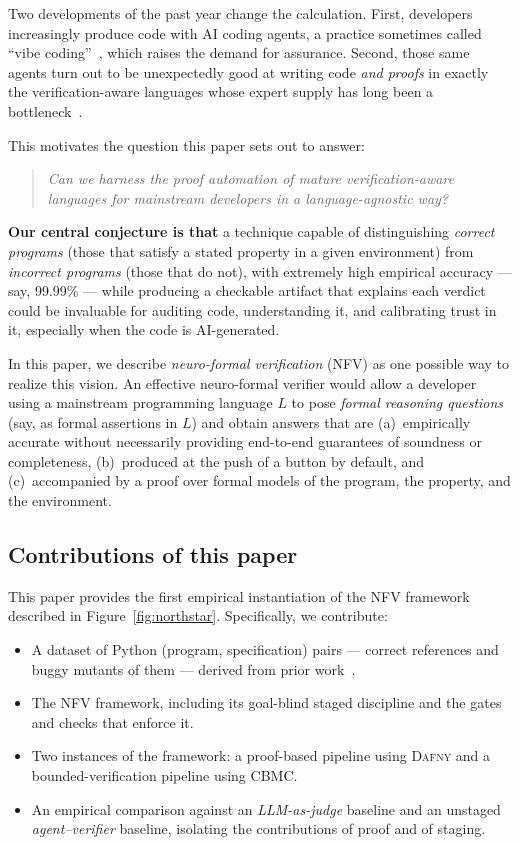\documentclass[11pt,letterpaper]{article}
\newcommand{\sys}{NFV}
\newcommand{\daf}{\textsc{Dafny}}
\newcommand{\cbmc}{\textsc{CBMC}}
\begin{document}
Two developments of the past year change the calculation. First, developers
increasingly produce code with AI coding agents, a practice sometimes called
``vibe coding''~\cite{karpathy2025vibe}, which raises the demand for assurance.
Second, those same agents turn out to be unexpectedly good at writing code
\emph{and proofs} in exactly the verification-aware languages whose expert
supply has long been a
bottleneck~\cite{misu2024dafny,first2023baldur,ioannidis2026proofspromptly}.

\medskip
\noindent
This motivates the question this paper sets out to answer:
\begin{quote}
\itshape
Can we harness the proof automation of mature verification-aware languages
for mainstream developers in a language-agnostic way?
\end{quote}

\textbf{Our central conjecture is that} a technique capable of distinguishing
\emph{correct programs} (those that satisfy a stated property in a given
environment) from \emph{incorrect programs} (those that do not), with extremely
high empirical accuracy --- say, 99.99\% --- while
producing a checkable artifact that explains each verdict could be invaluable
for auditing code, understanding it, and calibrating trust in it, especially
when the code is AI-generated.

In this paper, we describe \emph{neuro-formal verification} (NFV) as one
possible way to realize this vision. An effective neuro-formal verifier would
allow a developer using a mainstream programming language $L$ to pose
\emph{formal reasoning questions} (say, as formal assertions in $L$) and
obtain answers that are (a)~empirically accurate without necessarily providing
end-to-end guarantees of soundness or completeness,
(b)~produced at the push of a button by default, and (c)~accompanied by a proof
over formal models of the program, the property, and the environment.



\subsection{Contributions of this paper}
\label{sec:whatwedo}
This paper provides the first empirical instantiation of the NFV framework
described in Figure~\ref{fig:northstar}. Specifically, we contribute:

\begin{itemize}
\item A dataset of \dsentries{} Python (program, specification) pairs --- \dspairs{}
correct references and \dspairs{} buggy mutants of them --- derived from prior
work~\cite{endres2024nl2postcond}.
\item The \sys{} framework, including its goal-blind staged discipline and the
gates and checks that enforce it.
\item Two instances of the framework: a proof-based pipeline using \daf{} and a
bounded-verification pipeline using \cbmc{}.
\item An empirical comparison against an \emph{LLM-as-judge} baseline and an
unstaged \emph{agent--verifier} baseline, isolating the contributions of proof and
of staging.
\end{itemize}
\end{document}
